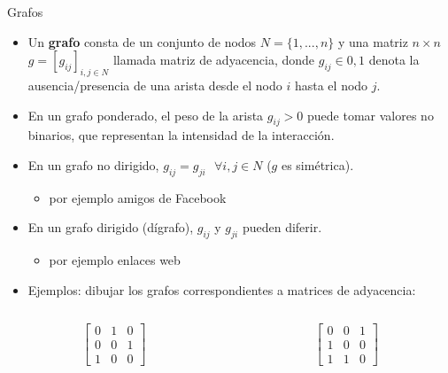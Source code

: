 \documentclass[11pt]{beamer}
\begin{document}
\begin{frame}{Grafos}
    \begin{itemize}
 \small       \item Un \textbf{grafo} consta de un conjunto de nodos $N = \{1, . . . , n \}$ y una matriz $n \times n$ $g = [g_{ij}]_{i,j \in N}$ llamada matriz de adyacencia, donde $g_{ij} \in {0,1}$ denota la ausencia/presencia de una arista desde el nodo $i$ hasta el nodo $j$.
\item En un grafo ponderado, el peso de la arista $g_{ij} > 0$ puede tomar valores no binarios, que representan la intensidad de la interacción.
\item En un grafo no dirigido, $g_{ij} = g_{ji} \text{ } \forall  i, j \in N $ ($g$ es simétrica).
\begin{itemize}
    \item por ejemplo amigos de Facebook
\end{itemize} 
\item En un grafo dirigido (dígrafo), $g_{ij}$ y $g_{ji}$ pueden diferir.
\begin{itemize}
    \item por ejemplo enlaces web
\end{itemize} 
\item Ejemplos: dibujar los grafos correspondientes a matrices de adyacencia:
    \end{itemize}
    \begin{columns}
    \centering
\begin{column}{0.5\textwidth}
\centering %
\begin{equation}
  \begin{bmatrix}
0 & 1 & 0\\
0 & 0 & 1 \\
1 & 0 & 0
\end{bmatrix}  
\end{equation}
\end{column}
\begin{column}{0.5\textwidth} \centering %
\begin{equation}
     \begin{bmatrix}
0 & 0 & 1\\
1 & 0 & 0 \\
1 & 1 & 0
\end{bmatrix}
\end{equation}

\end{column}
\end{columns}
\end{frame}
\end{document}
